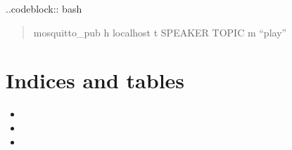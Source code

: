 \documentclass[letterpaper,10pt,english]{sphinxmanual}
\begin{document}
\begin{fulllineitems}

\pysigstartsignatures
{}
\pysigstopsignatures

\begin{fulllineitems}

\pysigstartsignatures
{}
\pysigstopsignatures
\sphinxAtStartPar
..code\sphinxhyphen{}block:: bash
\begin{quote}

\sphinxAtStartPar
mosquitto\_pub \sphinxhyphen{}h localhost \sphinxhyphen{}t {\color{red}\bfseries{}\textasciigrave{}\textasciigrave{}}SPEAKER TOPIC\textasciigrave{} \sphinxhyphen{}m “play”
\end{quote}

\end{fulllineitems}


\end{fulllineitems}



\chapter{Indices and tables}
\label{\detokenize{index:indices-and-tables}}\begin{itemize}
\item {} 
\sphinxAtStartPar
{}

\item {} 
\sphinxAtStartPar
{}

\item {} 
\sphinxAtStartPar
{}

\end{itemize}



\renewcommand{\indexname}{Index}
\printindex
\end{document}
